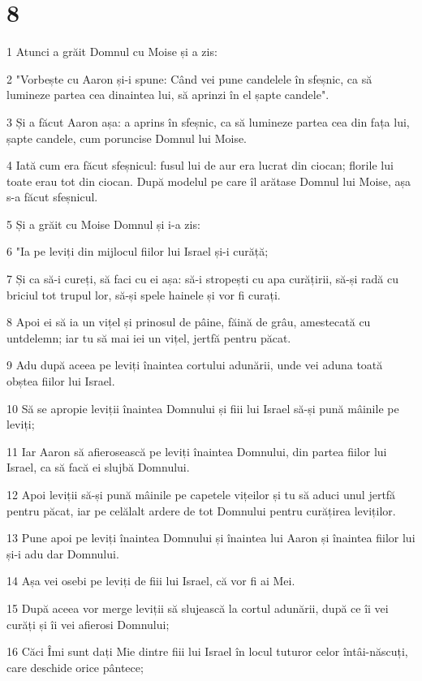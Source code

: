 \chapter{8}

\par 1 Atunci a grăit Domnul cu Moise și a zis:
\par 2 "Vorbește cu Aaron și-i spune: Când vei pune candelele în sfeșnic, ca să lumineze partea cea dinaintea lui, să aprinzi în el șapte candele".
\par 3 Și a făcut Aaron așa: a aprins în sfeșnic, ca să lumineze partea cea din fața lui, șapte candele, cum poruncise Domnul lui Moise.
\par 4 Iată cum era făcut sfeșnicul: fusul lui de aur era lucrat din ciocan; florile lui toate erau tot din ciocan. După modelul pe care îl arătase Domnul lui Moise, așa s-a făcut sfeșnicul.
\par 5 Și a grăit cu Moise Domnul și i-a zis:
\par 6 "Ia pe leviți din mijlocul fiilor lui Israel și-i curăță;
\par 7 Și ca să-i cureți, să faci cu ei așa: să-i stropești cu apa curățirii, să-și radă cu briciul tot trupul lor, să-și spele hainele și vor fi curați.
\par 8 Apoi ei să ia un vițel și prinosul de pâine, făină de grâu, amestecată cu untdelemn; iar tu să mai iei un vițel, jertfă pentru păcat.
\par 9 Adu după aceea pe leviți înaintea cortului adunării, unde vei aduna toată obștea fiilor lui Israel.
\par 10 Să se apropie leviții înaintea Domnului și fiii lui Israel să-și pună mâinile pe leviți;
\par 11 Iar Aaron să afierosească pe leviți înaintea Domnului, din partea fiilor lui Israel, ca să facă ei slujbă Domnului.
\par 12 Apoi leviții să-și pună mâinile pe capetele vițeilor și tu să aduci unul jertfă pentru păcat, iar pe celălalt ardere de tot Domnului pentru curățirea leviților.
\par 13 Pune apoi pe leviți înaintea Domnului și înaintea lui Aaron și înaintea fiilor lui și-i adu dar Domnului.
\par 14 Așa vei osebi pe leviți de fiii lui Israel, că vor fi ai Mei.
\par 15 După aceea vor merge leviții să slujească la cortul adunării, după ce îi vei curăți și îi vei afierosi Domnului;
\par 16 Căci Îmi sunt dați Mie dintre fiii lui Israel în locul tuturor celor întâi-născuți, care deschide orice pântece;
